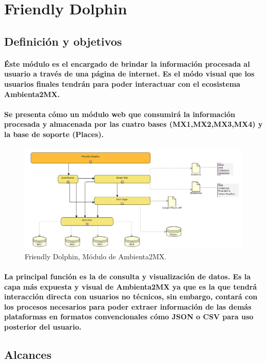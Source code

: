 \section{Friendly Dolphin}
  \subsection{Definición y objetivos}
    \paragraph{Éste módulo es el encargado de brindar la información procesada al usuario a través de una página de internet. Es el módo visual que los usuarios finales tendrán para poder interactuar con el ecosistema Ambienta2MX.}
    \paragraph{Se presenta cómo un módulo web que consumirá la información procesada y almacenada por las cuatro bases (MX1,MX2,MX3,MX4) y la base de soporte (Places).}
    \begin{figure}[h!]
        \centering
          \includegraphics[width=\textwidth]{./images/DiagramaAmbienta2MX_FriendlyDolphin.png}
        \caption{Friendly Dolphin, Módulo de Ambienta2MX.}
    \end{figure}
    \paragraph{La principal función es la de consulta y visualización de datos. Es la capa más expuesta y visual de Ambienta2MX ya que es la que tendrá interacción directa con usuarios no técnicos, sin embargo, contará con los procesos necesarios para poder extraer información de las demás plataformas en formatos convencionales cómo JSON o CSV para uso posterior del usuario.}
  \subsection{Alcances}
